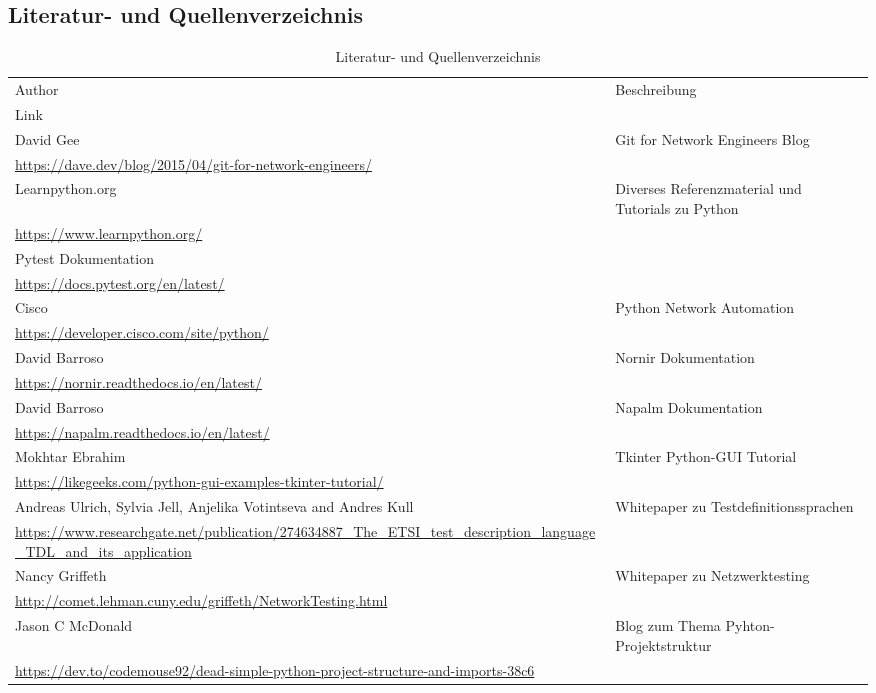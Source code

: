 \documentclass[]{subfiles}
\begin{document}
\clearpage
{}
\listoffigures*
\clearpage
\listoftables*

\newpage
\subsection*{Literatur- und Quellenverzeichnis}
\begin{table}[h!]
    \begin{tabularx}{\textwidth}{Xl}
        \toprule
        Author & Beschreibung \\
        Link & \\
        \midrule
        David Gee & Git for Network Engineers Blog \\
        \url{https://dave.dev/blog/2015/04/git-for-network-engineers/} & \\
        \midrule
        Learnpython.org & Diverses Referenzmaterial und Tutorials zu Python \\
        \url{https://www.learnpython.org/} & \\
        \midrule
        Pytest Dokumentation & \\
        \url{https://docs.pytest.org/en/latest/} & \\
        \midrule
        Cisco & Python Network Automation \\
        \url{https://developer.cisco.com/site/python/} & \\
        \midrule
        David Barroso & Nornir Dokumentation \\
        \url{https://nornir.readthedocs.io/en/latest/} & \\
        \midrule
        David Barroso & Napalm Dokumentation \\
        \url{https://napalm.readthedocs.io/en/latest/} & \\      
        \midrule   
        Mokhtar Ebrahim & Tkinter Python-GUI Tutorial \\
        \url{https://likegeeks.com/python-gui-examples-tkinter-tutorial/} & \\
        \midrule
        Andreas Ulrich, Sylvia Jell, Anjelika Votintseva and Andres Kull & Whitepaper zu Testdefinitionssprachen \\         
        \url{https://www.researchgate.net/publication/274634887_The_ETSI_test_description_language_TDL_and_its_application} & \\
        \midrule
        Nancy Griffeth & Whitepaper zu Netzwerktesting \\
        \url{http://comet.lehman.cuny.edu/griffeth/NetworkTesting.html} & \\
        \midrule        
        Jason C McDonald & Blog zum Thema Pyhton-Projektstruktur \\
        \url{https://dev.to/codemouse92/dead-simple-python-project-structure-and-imports-38c6} & \\
        \bottomrule
    \end{tabularx}
    \caption{Literatur- und Quellenverzeichnis}
\end{table}
\end{document}
